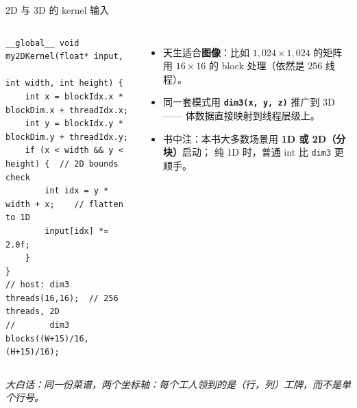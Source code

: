 \documentclass[aspectratio=169]{beamer}
\newcommand{\kw}[1]{\textbf{\textcolor{kwblue}{#1}}}
\newcommand{\pe}[1]{{\footnotesize\itshape 大白话：#1}}
\begin{document}
\begin{frame}[fragile]{2D 与 3D 的 kernel 输入}
  \begin{columns}[t]
\begin{lstlisting}
__global__ void my2DKernel(float* input,
                           int width, int height) {
    int x = blockIdx.x * blockDim.x + threadIdx.x;
    int y = blockIdx.y * blockDim.y + threadIdx.y;
    if (x < width && y < height) {  // 2D bounds check
        int idx = y * width + x;    // flatten to 1D
        input[idx] *= 2.0f;
    }
}
// host: dim3 threads(16,16);  // 256 threads, 2D
//       dim3 blocks((W+15)/16, (H+15)/16);
\end{lstlisting}
    \begin{itemize}
      \item 天生适合\kw{图像}：比如 $1{,}024 \times 1{,}024$ 的矩阵用
            $16 \times 16$ 的 block 处理（依然是 256 线程）。
      \item 同一套模式用 \kw{\texttt{dim3(x, y, z)}} 推广到 3D ——
            体数据直接映射到线程层级上。
      \item 书中注：本书大多数场景用 \kw{1D 或 2D（分块）}启动；
            纯 1D 时，普通 int 比 \texttt{dim3} 更顺手。
    \end{itemize}
  \end{columns}
  \medskip
  \pe{同一份菜谱，两个坐标轴：每个工人领到的是（行，列）工牌，而不是单个行号。}
\end{frame}
\end{document}
